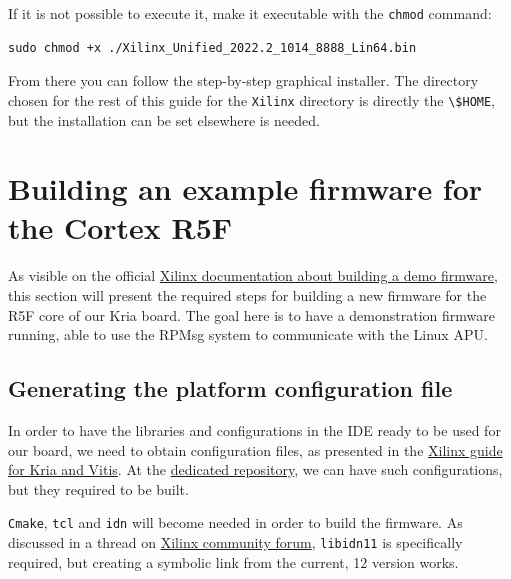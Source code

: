 \documentclass[10pt]{article}
\begin{document}
If it is not possible to execute it, make it executable with the \verb|chmod| command:
\begin{tcolorbox}
\begin{verbatim}
sudo chmod +x ./Xilinx_Unified_2022.2_1014_8888_Lin64.bin
\end{verbatim}
\end{tcolorbox}

From there you can follow the step-by-step graphical installer.
The directory chosen for the rest of this guide for the \verb|Xilinx| directory
is directly the \verb|\$HOME|, but the installation can be set elsewhere is needed.


\section{Building an example firmware for the Cortex R5F}
\label{sec:bulding-an-example}
As visible on the official \href{https://xilinx-wiki.atlassian.net/wiki/spaces/A/pages/1837006921/OpenAMP+Base+Hardware+Configurations\#Build-RPU-firmware}{Xilinx documentation about building a demo firmware}, this section will present the required steps for building a new firmware for the R5F core of our Kria board. The goal
here is to have a demonstration firmware running, able to use the RPMsg system to communicate with the Linux APU.

\subsection{Generating the platform configuration file}
\label{sec:gener-platf-conf}
In order to have the libraries and configurations in the IDE ready to be used for our board, we need to obtain configuration files, as presented in the 
\href{https://xilinx.github.io/kria-apps-docs/kv260/2022.1/build/html/docs/build_vitis_platform.html?highlight=xsa}{Xilinx guide for Kria and Vitis}. At the \href{https://github.com/Xilinx/kria-vitis-platforms}{dedicated repository}, we can have such configurations, but they required to be built.

\verb|Cmake|, \verb|tcl| and \verb|idn| will become needed in order to build the firmware.
As discussed in a thread on \href{https://support.xilinx.com/s/question/0D52E00006jrzsYSAQ/platform-project-cannot-be-created-on-vitis?language=en\_US}{Xilinx community forum}, \verb|libidn11| is specifically required, but creating a symbolic link from the current, 12 version works.
\end{document}

